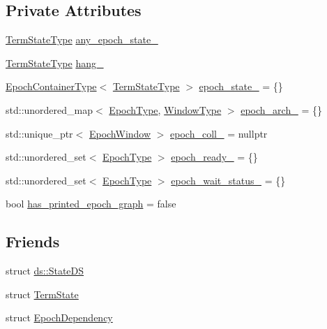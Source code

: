 \subsection*{Private Attributes}
\begin{DoxyCompactItemize}
\item 
\hyperlink{structvt_1_1term_1_1_term_action_ae4c635b69751d887666814700ed64d65}{Term\+State\+Type} \hyperlink{structvt_1_1term_1_1_termination_detector_a49337963d174e5be73fcf467304428a6}{any\+\_\+epoch\+\_\+state\+\_\+}
\item 
\hyperlink{structvt_1_1term_1_1_term_action_ae4c635b69751d887666814700ed64d65}{Term\+State\+Type} \hyperlink{structvt_1_1term_1_1_termination_detector_a5f873fb4a66c8364ec7859bbc608fe55}{hang\+\_\+}
\item 
\hyperlink{structvt_1_1term_1_1_termination_detector_a69e2615b61e072977463eea5b20b7933}{Epoch\+Container\+Type}$<$ \hyperlink{structvt_1_1term_1_1_term_action_ae4c635b69751d887666814700ed64d65}{Term\+State\+Type} $>$ \hyperlink{structvt_1_1term_1_1_termination_detector_a0c55ef5345253002f9de6e5c4337c53a}{epoch\+\_\+state\+\_\+} = \{\}
\item 
std\+::unordered\+\_\+map$<$ \hyperlink{namespacevt_a985a5adf291c34a3ca263b3378388236}{Epoch\+Type}, \hyperlink{structvt_1_1term_1_1_termination_detector_a2c002273d9304c3cf72be85dd7d3ce52}{Window\+Type} $>$ \hyperlink{structvt_1_1term_1_1_termination_detector_a876ef1f0029acf64d473f23a8f78b2f7}{epoch\+\_\+arch\+\_\+} = \{\}
\item 
std\+::unique\+\_\+ptr$<$ \hyperlink{structvt_1_1term_1_1_epoch_window}{Epoch\+Window} $>$ \hyperlink{structvt_1_1term_1_1_termination_detector_ad44ae49373693dff2bafb7afae937c9b}{epoch\+\_\+coll\+\_\+} = nullptr
\item 
std\+::unordered\+\_\+set$<$ \hyperlink{namespacevt_a985a5adf291c34a3ca263b3378388236}{Epoch\+Type} $>$ \hyperlink{structvt_1_1term_1_1_termination_detector_a22c7c6cc9c6cd48b5570dbae226a56f3}{epoch\+\_\+ready\+\_\+} = \{\}
\item 
std\+::unordered\+\_\+set$<$ \hyperlink{namespacevt_a985a5adf291c34a3ca263b3378388236}{Epoch\+Type} $>$ \hyperlink{structvt_1_1term_1_1_termination_detector_a95cdb85a87fcf162725bc6515b43a002}{epoch\+\_\+wait\+\_\+status\+\_\+} = \{\}
\item 
bool \hyperlink{structvt_1_1term_1_1_termination_detector_a68afeac40869ccc50882f717106b382f}{has\+\_\+printed\+\_\+epoch\+\_\+graph} = false
\end{DoxyCompactItemize}
\subsection*{Friends}
\begin{DoxyCompactItemize}
\item 
struct \hyperlink{structvt_1_1term_1_1_termination_detector_a9c0b991de134b4bc5bebf051bd067b9f}{ds\+::\+State\+DS}
\item 
struct \hyperlink{structvt_1_1term_1_1_termination_detector_a628421bb882cfbd05876660b5b7dc150}{Term\+State}
\item 
struct \hyperlink{structvt_1_1term_1_1_termination_detector_aee175d34803c93c65e4323ab28f04088}{Epoch\+Dependency}
\end{DoxyCompactItemize}
